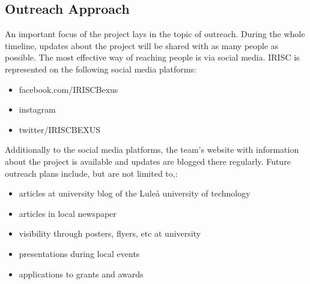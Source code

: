 
\subsection{Outreach Approach}
An important focus of the project lays in the topic of outreach. During the whole timeline, updates about the project will be shared with as many people as possible. The most effective way of reaching people is via social media. IRISC is represented on the following social media platforms:
\begin{itemize}
	\item facebook.com/IRISCBexus
	\item instagram
	\item twitter/IRISCBEXUS
\end{itemize}
Additionally to the social media platforms, the team's website with information about the project is available and updates are blogged there regularly.\newline\newline
Future outreach plans include, but are not limited to,:
\begin{itemize}
	\item articles at university blog of the Luleå university of technology
	\item articles in local newspaper
	\item visibility through posters, flyers, etc at university
	\item presentations during local events
	\item applications to grants and awards
\end{itemize}

